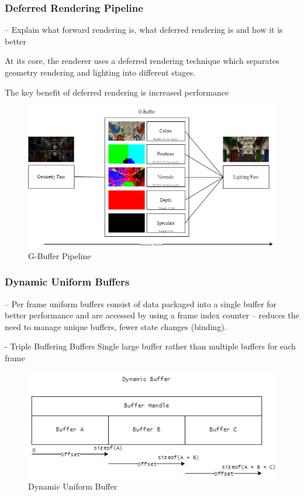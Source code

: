 \documentclass[11pt]{article}
\begin{document}
\subsubsection{Deferred Rendering Pipeline}

-- Explain what forward rendering is, what deferred rendering is and how it is better

At its core, the renderer uses a deferred rendering technique which separates geometry rendering and
lighting into different stages. 

The key benefit of deferred rendering is increased performance 

\begin{figure}[h!]
  \centering
  \includegraphics[width=\textwidth]{images/g_buffer.png}
  \caption{G-Buffer Pipeline}
  \label{fig:g_buffer}
\end{figure}

\subsubsection{Dynamic Uniform Buffers}
-- Per frame uniform buffers consist of data packaged into a single buffer for 
better performance and are accessed by using a frame index counter
-- reduces the need to manage unique buffers, fewer state changes (binding).

-   Triple Buffering Buffers Single large buffer rather than multiple buffers for each frame

\begin{figure}[h!]
  \centering
  \includegraphics[width=\textwidth]{images/dynamic_buffer.png}
  \caption{Dynamic Uniform Buffer}
  \label{fig:dynamic_uniform_buffer}
\end{figure}
\end{document}
